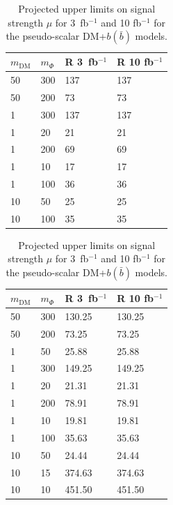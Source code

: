 \begin{table}
  \small
  \centering
\begin{minipage}{.45\textwidth}{
  \begin{tabular}{llll}
    \hline                      
    $m_\textrm{DM}$ & $m_\Phi$  & R 3~fb$^{-1}$ & R 10 fb$^{-1}$ \\ \hline
    50 & 300 & 137 & 137 \\ \hline
    50 & 200 & 73  & 73  \\ \hline
    1  & 300 & 137 & 137 \\ \hline
    1  & 20  & 21  & 21  \\ \hline
    1  & 200 & 69  & 69  \\ \hline
    1  & 10  & 17  & 17  \\ \hline
    1  & 100 & 36  & 36  \\ \hline
    10 & 50  & 25  & 25  \\ \hline
    10 & 100 & 35  & 35 \\ \hline
  \end{tabular}
  \caption{Projected  upper limits on signal strength $\mu$ for 3~fb$^{-1}$ and 10 fb$^{-1}$ for the scalar  DM+$b(\bar{b})$ models. \label{tab:dmbb_S_R_values}}
}\end{minipage}%
\hfill
\begin{minipage}{.45\textwidth}{
  \begin{tabular}{llll}
    \hline                      
    $m_\textrm{DM}$ & $m_\Phi$  & R 3~fb$^{-1}$ & R 10 fb$^{-1}$ \\ \hline
    50 & 300 & 130.25 & 130.25 \\ \hline
    50 & 200 & 73.25  & 73.25  \\ \hline
    1  & 50  & 25.88  & 25.88  \\ \hline
    1  & 300 & 149.25 & 149.25 \\ \hline
    1  & 20  & 21.31  & 21.31  \\ \hline
    1  & 200 & 78.91  & 78.91  \\ \hline
    1  & 10  & 19.81  & 19.81  \\ \hline
    1  & 100 & 35.63  & 35.63  \\ \hline
    10 & 50  & 24.44  & 24.44  \\ \hline
    10 & 15  & 374.63 & 374.63 \\ \hline
    10 & 10  & 451.50 & 451.50 \\ \hline
  \end{tabular}
  \caption{Projected  upper limits on signal strength $\mu$ for 3~fb$^{-1}$ and 10 fb$^{-1}$ for the pseudo-scalar DM+$b(\bar{b})$ models. \label{tab:dmbb_P_R_values}}
}\end{minipage}
\end{table}


